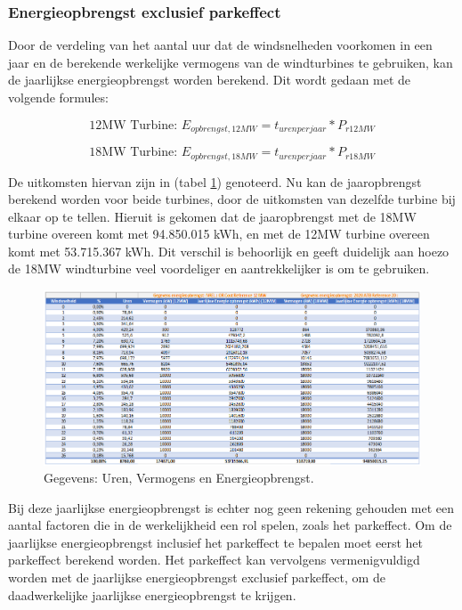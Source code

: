 \subsubsection{Energieopbrengst exclusief parkeffect}
Door de verdeling van het aantal uur dat de windsnelheden voorkomen in een jaar en de berekende werkelijke vermogens van de windturbines te gebruiken, kan de jaarlijkse energieopbrengst worden berekend. Dit wordt gedaan met de volgende formules: 

\begin{equation} \label{eq:8}
\text{12MW Turbine: } E_{opbrengst,12MW}=t_{uren per jaar}*P_{r12MW}
\end{equation}

\begin{equation} \label{eq:9}
\text{18MW Turbine: } E_{opbrengst,18MW}=t_{uren per jaar}*P_{r18MW}
\end{equation}

De uitkomsten hiervan zijn in (tabel \ref{fig:Jaaropbrengst}) genoteerd. Nu kan de jaaropbrengst berekend worden voor beide turbines, door de uitkomsten van dezelfde turbine bij elkaar op te tellen. Hieruit is gekomen dat de jaaropbrengst met de 18MW turbine overeen komt met 94.850.015 kWh, en met de 12MW turbine overeen komt met 53.715.367 kWh. Dit verschil is behoorlijk en geeft duidelijk aan hoezo de 18MW windturbine veel voordeliger en aantrekkelijker is om te gebruiken. 
\begin{figure}[H]
\centering
\includegraphics[width=1\textwidth]{IMG/data/overzicht/Jaaropbrengst.PNG}
\caption{Gegevens: Uren, Vermogens en Energieopbrengst.}
\label{fig:Jaaropbrengst}
\end{figure}
Bij deze jaarlijkse energieopbrengst is echter nog geen rekening gehouden met een aantal factoren die in de werkelijkheid een rol spelen, zoals het parkeffect. Om de jaarlijkse energieopbrengst inclusief het parkeffect te bepalen moet eerst het parkeffect berekend worden. Het parkeffect kan vervolgens vermenigvuldigd worden met de jaarlijkse energieopbrengst exclusief parkeffect, om de daadwerkelijke jaarlijkse energieopbrengst te krijgen. 

